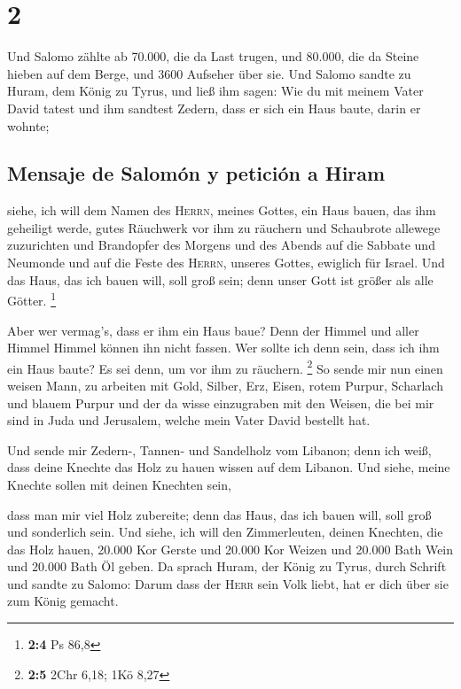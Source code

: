 \hypertarget{section-1}{%
\section{2}\label{section-1}}

 Und Salomo zählte ab 70.000, die da Last trugen, und
80.000, die da Steine hieben auf dem Berge, und 3600 Aufseher über sie.
 Und Salomo sandte zu Huram, dem König zu Tyrus, und ließ
ihm sagen: Wie du mit meinem Vater David tatest und ihm sandtest Zedern,
dass er sich ein Haus baute, darin er wohnte;

\hypertarget{mensaje-de-salomuxf3n-y-peticiuxf3n-a-hiram}{%
\subsection{Mensaje de Salomón y petición a
Hiram}\label{mensaje-de-salomuxf3n-y-peticiuxf3n-a-hiram}}

 siehe, ich will dem Namen des \textsc{Herrn}, meines
Gottes, ein Haus bauen, das ihm geheiligt werde, gutes Räuchwerk vor ihm
zu räuchern und Schaubrote allewege zuzurichten und Brandopfer des
Morgens und des Abends auf die Sabbate und Neumonde und auf die Feste
des \textsc{Herrn}, unseres Gottes, ewiglich für Israel. 
Und das Haus, das ich bauen will, soll groß sein; denn unser Gott ist
größer als alle Götter. \footnote{\textbf{2:4} Ps 86,8}

 Aber wer vermag's, dass er ihm ein Haus baue? Denn der
Himmel und aller Himmel Himmel können ihn nicht fassen. Wer sollte ich
denn sein, dass ich ihm ein Haus baute? Es sei denn, um vor ihm zu
räuchern. \footnote{\textbf{2:5} 2Chr 6,18; 1Kö 8,27}  So
sende mir nun einen weisen Mann, zu arbeiten mit Gold, Silber, Erz,
Eisen, rotem Purpur, Scharlach und blauem Purpur und der da wisse
einzugraben mit den Weisen, die bei mir sind in Juda und Jerusalem,
welche mein Vater David bestellt hat.

 Und sende mir Zedern-, Tannen- und Sandelholz vom
Libanon; denn ich weiß, dass deine Knechte das Holz zu hauen wissen auf
dem Libanon. Und siehe, meine Knechte sollen mit deinen Knechten sein,

 dass man mir viel Holz zubereite; denn das Haus, das ich
bauen will, soll groß und sonderlich sein.  Und siehe, ich
will den Zimmerleuten, deinen Knechten, die das Holz hauen, 20.000 Kor
Gerste und 20.000 Kor Weizen und 20.000 Bath Wein und 20.000 Bath Öl
geben.  Da sprach Huram, der König zu Tyrus, durch
Schrift und sandte zu Salomo: Darum dass der \textsc{Herr} sein Volk
liebt, hat er dich über sie zum König gemacht.

